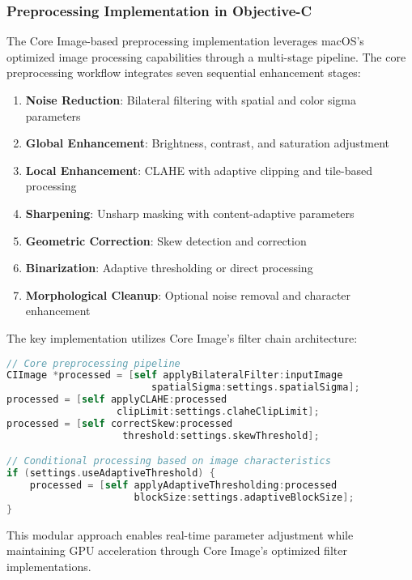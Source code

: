 \subsubsection{Preprocessing Implementation in Objective-C}

The Core Image-based preprocessing implementation leverages macOS's optimized image processing capabilities through a multi-stage pipeline. The core preprocessing workflow integrates seven sequential enhancement stages:

\begin{enumerate}
\item \textbf{Noise Reduction}: Bilateral filtering with spatial and color sigma parameters
\item \textbf{Global Enhancement}: Brightness, contrast, and saturation adjustment
\item \textbf{Local Enhancement}: CLAHE with adaptive clipping and tile-based processing
\item \textbf{Sharpening}: Unsharp masking with content-adaptive parameters
\item \textbf{Geometric Correction}: Skew detection and correction
\item \textbf{Binarization}: Adaptive thresholding or direct processing
\item \textbf{Morphological Cleanup}: Optional noise removal and character enhancement
\end{enumerate}

The key implementation utilizes Core Image's filter chain architecture:

\begin{lstlisting}[language=C,basicstyle=\footnotesize\ttfamily,frame=single,breaklines=true,columns=flexible]
// Core preprocessing pipeline
CIImage *processed = [self applyBilateralFilter:inputImage 
                         spatialSigma:settings.spatialSigma];
processed = [self applyCLAHE:processed 
                   clipLimit:settings.claheClipLimit];
processed = [self correctSkew:processed 
                    threshold:settings.skewThreshold];

// Conditional processing based on image characteristics
if (settings.useAdaptiveThreshold) {
    processed = [self applyAdaptiveThresholding:processed 
                      blockSize:settings.adaptiveBlockSize];
}
\end{lstlisting}

This modular approach enables real-time parameter adjustment while maintaining GPU acceleration through Core Image's optimized filter implementations.


